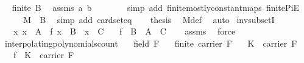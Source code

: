 \begin{isabellebody}
\ \isamarkupfalse%
\ {\isachardoublequoteopen}finite\ {\isacharquery}{\kern0pt}B{\isachardoublequoteclose}\ \isamarkupfalse%
\ assms{\isacharparenleft}{\kern0pt}{}{\isacharparenright}{\kern0pt}\ a\ b\ \ \isanewline
\ \ \ \ \isamarkupfalse%
\ {\isacharparenleft}{\kern0pt}simp\ add{\isacharcolon}{\kern0pt}\ finite{\isacharunderscore}{\kern0pt}mostly{\isacharunderscore}{\kern0pt}constant{\isacharunderscore}{\kern0pt}maps\ finite{\isacharunderscore}{\kern0pt}PiE{\isacharparenright}{\kern0pt}\isanewline
\ \ \isamarkupfalse%
\ \isamarkupfalse%
\ {\isachardoublequoteopen}M\ {\isacharequal}{\kern0pt}\ {\isacharquery}{\kern0pt}B{\isachardoublequoteclose}\ \isamarkupfalse%
\ {\isacharparenleft}{\kern0pt}simp\ add{\isacharcolon}{\kern0pt}\ card{\isacharunderscore}{\kern0pt}seteq{\isacharparenright}{\kern0pt}\isanewline
\ \ \isamarkupfalse%
\ {\isacharquery}{\kern0pt}thesis\ \isamarkupfalse%
\ M{\isacharunderscore}{\kern0pt}def\ \isamarkupfalse%
\ auto\isanewline
{}\isamarkupfalse%
%
\endisatagproof
{\isafoldproof}%
%
\isadelimproof
\isanewline
%
\endisadelimproof
\isanewline
{}\isamarkupfalse%
\ inv{\isacharunderscore}{\kern0pt}subsetI{\isacharcolon}{\kern0pt}\isanewline
\ \ \ {\isachardoublequoteopen}{\isasymAnd}x{\isachardot}{\kern0pt}\ x\ {\isasymin}\ A\ {\isasymLongrightarrow}\ f\ x\ {\isasymin}\ B\ {\isasymLongrightarrow}\ x\ {\isasymin}\ C{\isachardoublequoteclose}\isanewline
\ \ \ {\isachardoublequoteopen}f\ {\isacharminus}{\kern0pt}{\isacharbackquote}{\kern0pt}\ B\ {\isasyminter}\ A\ {\isasymsubseteq}\ C{\isachardoublequoteclose}\isanewline
%
\isadelimproof
\ \ %
\endisadelimproof
%
\isatagproof
{}\isamarkupfalse%
\ assms\ \isamarkupfalse%
\ force%
\endisatagproof
{\isafoldproof}%
%
\isadelimproof
\isanewline
%
\endisadelimproof
\isanewline
{}\isamarkupfalse%
\ interpolating{\isacharunderscore}{\kern0pt}polynomials{\isacharunderscore}{\kern0pt}count{\isacharcolon}{\kern0pt}\isanewline
\ \ \ {\isachardoublequoteopen}field\ F{\isachardoublequoteclose}\isanewline
\ \ \ {\isachardoublequoteopen}finite\ {\isacharparenleft}{\kern0pt}carrier\ F{\isacharparenright}{\kern0pt}{\isachardoublequoteclose}\isanewline
\ \ \ {\isachardoublequoteopen}K\ {\isasymsubseteq}\ carrier\ F{\isachardoublequoteclose}\isanewline
\ \ \ {\isachardoublequoteopen}f\ {\isacharbackquote}{\kern0pt}\ K\ {\isasymsubseteq}\ carrier\ F{\isachardoublequoteclose}\isanewline

\end{isabellebody}

